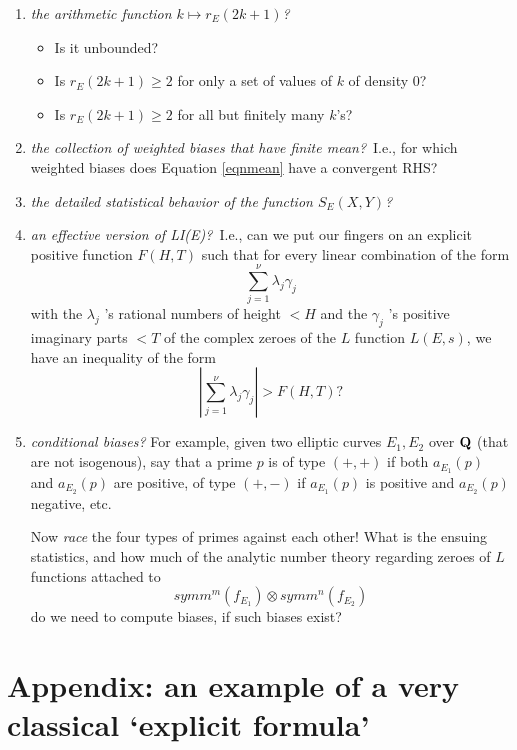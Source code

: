 \documentclass[11pt]{article}
\theoremstyle{plain}
\theoremstyle{definition}
\numberwithin{equation}{section}
\numberwithin{figure}{section}
\numberwithin{table}{section}
\def\Q{\bf{Q}}
\begin{document}
 \begin{enumerate}\item  {\it the arithmetic function  $k \mapsto r_E(2k+1)$?}
 \begin{itemize} \item Is it unbounded?
 \item Is $r_E(2k+1)\ge 2$ for  only a set of values of $k$ of density $0$?
 \item  Is  $r_E(2k+1)\ge 2$ for all but finitely many $k$'s?  \end{itemize} \vskip20pt
 \item {\it  the collection of weighted biases that have finite mean?}\  I.e., for which weighted biases does Equation \ref{eqnmean} have a convergent RHS?

 \vskip20pt \item {\it the detailed statistical behavior of the function $S_E(X,Y)$?}

  \vskip20pt \item {\it an effective version of LI(E)?}\  I.e., can we put our fingers on an explicit  positive function $F(H,T)$ such that for every linear combination of the form $$\sum_{j=1}^{\nu} \lambda_j\gamma_j$$ with the $\lambda_j$ 's rational numbers of height $< H$ and the  $\gamma_j$ 's  positive imaginary parts $<T$ of the complex zeroes of the $L$ function $L(E,s)$, we have  an inequality of the form $$\left|\sum_{j=1}^{\nu} \lambda_j\gamma_j\right|  > F(H, T)?$$

   \vskip20pt \item {\it conditional biases?}  For example, given two elliptic curves $E_1, E_2$ over ${\Q}$ (that are not isogenous), say that a prime $p$ is of type $(+,+)$ if both $a_{E_1}(p)$ and $a_{E_2}(p)$ are positive, of type  $(+,-)$ if  $a_{E_1}(p)$ is  positive and $a_{E_2}(p)$ negative, etc.

 Now  {\it race} the four types of primes against each other!  What is the ensuing statistics, and how much of the analytic number theory regarding zeroes of $L$ functions attached to  $$symm^m(f_{E_1})\otimes symm^n(f_{E_2})$$  do we need to compute biases, if  such biases exist? \end{enumerate}
\vskip10pt
\section{Appendix: an example of a very classical `explicit formula'}
\end{document}

